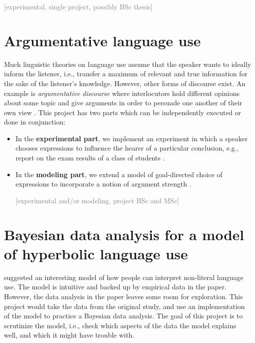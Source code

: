 \documentclass[fleqn,reqno,10pt]{article}
\newcommand{\scope}[1]{\hfill\textcolor{gray}{[#1]}}
\begin{document}
\scope{experimental, single project, possibly BSc thesis}

\section{Argumentative language use}

Much linguistic theories on language use assume that the speaker wants to ideally inform the listener, i.e., transfer a maximum of relevant and true information for the sake of the listener's knowledge. However, other forms of discourse exist. An example is \emph{argumentative discourse} where interlocutors hold different opinions about some topic and give arguments in order to persuade one another of their own view \citep[e.g.][]{AnscombreDucrot1983:Largumentation-,MerinInfoRelSocialDecisionmaking1999,GlazerRubinstein2006:A-Game-Theoreti}. This project has two parts which can be independently executed or done in conjunction:
\begin{itemize}
\item In the \textbf{experimental part}, we implement an experiment in which a speaker chooses expressions to influence the hearer of a particular conclusion, e.g., report on the exam results of a class of students \citep[using similar stimuli as][]{Cummins2012:Using-embedded-}.
\item In the \textbf{modeling part}, we extend a model of goal-directed choice of expressions to incorporate a notion of argument strength \citep[e.g., the notion of argumentative relevance of][]{MerinInfoRelSocialDecisionmaking1999}.

\scope{experimental and/or modeling, project BSc and MSc}

\end{itemize}

\section{Bayesian data analysis for a model of hyperbolic language use}

\citet{KaoWu2014:Nonliteral-Unde} suggested an interesting model of how people can interpret non-literal language use. The model is intuitive and backed up by empirical data in the paper. However, the data analysis in the paper leaves some room for exploration. This project would take the data from the original study, and use an implementation of the model to practice a Bayesian data analysis. The goal of this project is to scrutinize the model, i.e., check which aspects of the data the model explains well, and which it might have trouble with.
\end{document}
